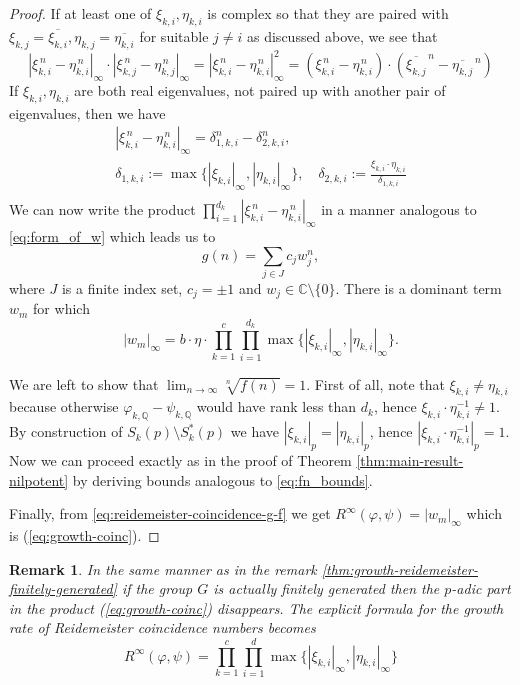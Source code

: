 \documentclass[12pt, a4paper]{amsart}
\def\C{{\mathbb C}}
\def\Q{{\mathbb Q}}
\newtheorem{remark}[theorem]{Remark}
\begin{document}
\begin{proof}
  If at least one of $\xi_{k,i}, \eta_{k,i}$ is complex so that they are paired with
  $\xi_{k,j} = \overline{\xi_{k,i}}, \eta_{k,j} = \overline{\eta_{k,i}}$ for suitable $j \neq i$
  as discussed above, we see that
  \[
    |\xi_{k,i}^{\, n} - \eta_{k,i}^{\, n}|_\infty \cdot |\xi_{k,j}^{\, n} - \eta_{k,j}^{\, n}|_\infty
    = |\xi_{k,i}^{\, n} - \eta_{k,i}^{\, n}|_\infty^2
    = (\xi_{k,i}^{\, n} - \eta_{k,i}^{\, n}) \cdot (\overline{\xi_{k,j}}^{\, n} - \overline{\eta_{k,j}}^{\, n})
  \]
  If $\xi_{k,i}, \eta_{k,i}$ are both real eigenvalues, not paired up with another pair of eigenvalues,
  then we have
  \begin{gather*}
    |\xi_{k,i}^{\, n} - \eta_{k,i}^{\, n}|_\infty = \delta_{1,k,i}^n - \delta_{2,k,i}^n,\\
    \delta_{1,k,i} := \max \{|\xi_{k,i}|_\infty, |\eta_{k,i}|_\infty\}, \quad
    \delta_{2,k,i} := \frac{\xi_{k,i} \cdot \eta_{k,i}}{\delta_{1,k,i}}\\
  \end{gather*}
  We can now write the product $\prod_{i=1}^{d_k} |\xi_{k,i}^{\, n} - \eta_{k,i}^{\, n}|_\infty$
  in a manner analogous to \eqref{eq:form_of_w} which leads us to
  \[
    g(n) = \sum_{j \in J} c_j w_j^n,
  \]
  where $J$ is a finite index set, $c_j = \pm 1$ and $w_j \in \C \setminus \{0\}$.
  There is a dominant term $w_m$ for which
  \[
    |w_m|_\infty =  b \cdot \eta \cdot
    \prod_{k=1}^c \prod_{i=1}^{d_k} \max \big\{ |\xi_{k,i}|_\infty, |\eta_{k,i}|_\infty \big\}.
  \]

  We are left to show that $\lim_{n\to\infty} \sqrt[n]{f(n)} = 1$.
  First of all, note that $\xi_{k,i} \neq \eta_{k,i}$ because otherwise $\varphi_{k,\Q} - \psi_{k,\Q}$
  would have rank less than $d_k$, hence $\xi_{k,i}\cdot\eta_{k,i}^{-1} \neq 1$.
  By construction of $S_k(p) \setminus S_k^*(p)$ we have $|\xi_{k,i}|_p = |\eta_{k,i}|_p$,
  hence $|\xi_{k,i} \cdot \eta_{k,i}^{-1}|_p = 1$.
  Now we can proceed exactly as in the proof of Theorem \ref{thm:main-result-nilpotent}
  by deriving bounds analogous to \eqref{eq:fn_bounds}.

  Finally, from \eqref{eq:reidemeister-coincidence-g-f} we get
  $R^\infty(\varphi, \psi) = |w_m|_\infty$ which is (\ref{eq:growth-coinc}).
\end{proof}

\begin{remark}\label{thm:growth-rate-coincidence-reidemeister-finitely-generated}
  In the same manner as in the remark \ref{thm:growth-reidemeister-finitely-generated}
  if the group $G$ is actually finitely generated then the $p$-adic part
  in the product {\rm (\ref{eq:growth-coinc})} disappears.
  The explicit formula for the growth rate of Reidemeister coincidence numbers becomes
  \begin{equation}\label{eq:growth-rate-coincidence-reidemeister-finitely-generated}
    R^\infty(\varphi,\psi) =
    \prod_{k=1}^c \prod_{i=1}^{d} \max\{|\xi_{k,i}|_\infty, |\eta_{k,i}|_\infty\}
  \end{equation}
\end{remark}
\end{document}

